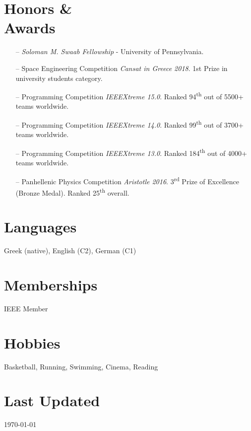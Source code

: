 \documentclass[margin]{res}
\begin{document}
\begin{resume}
\section{Honors \& \\ Awards} 

\begin{itemize}[nosep]
  \item[--] 
    \emph{Soloman M. Swaab Fellowship} - University of Pennsylvania.
	\item[--] 
    Space Engineering Competition \emph{Cansat in Greece 2018}.
    1st Prize in university students category.
  \item[--] 
    Programming Competition \emph{IEEEXtreme 15.0}.
    Ranked 94\textsuperscript{th} out of 5500+ teams worldwide.
  \item[--] 
    Programming Competition \emph{IEEEXtreme 14.0}.
    Ranked 99\textsuperscript{th} out of 3700+ teams worldwide.
  \item[--] 
    Programming Competition \emph{IEEEXtreme 13.0}.
    Ranked 184\textsuperscript{th} out of 4000+ teams worldwide.
  \item[--] 
    Panhellenic Physics Competition \emph{Aristotle 2016}.
    3\textsuperscript{rd} Prize of Excellence (Bronze Medal). 
    Ranked 25\textsuperscript{th} overall.
\end{itemize}

\section{Languages} Greek (native), English (C2), German (C1)

\section{Memberships} IEEE Member

\begin{comment}
\section{References \\ available \\ upon request}
\end{comment}

\section{Hobbies}
Basketball, Running, Swimming, Cinema, Reading

\section{Last Updated} \today

\end{resume}
\(\)
\end{document}
